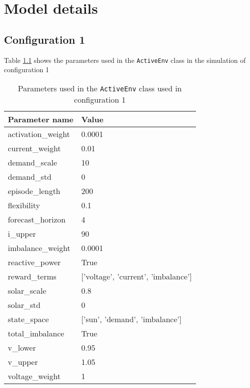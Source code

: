 \documentclass[class=book, crop=false, 11pt]{standalone}
\begin{document}
\chapter{Model details}
\section{Configuration 1}\label{section:apendix_config1}
Table \ref{apendix:config1:params} shows the parameters used in the \texttt{ActiveEnv} class in the simulation of configuration 1

\begin{table}[ht]
\center
\caption{Parameters used in the \texttt{ActiveEnv} class used in configuration 1}
\begin{tabular}{ll}
Parameter name     & Value                                     \\
\hline
activation\_weight & 0.0001                                    \\
current\_weight    & 0.01                                      \\
demand\_scale      & 10                                        \\
demand\_std        & 0                                         \\
episode\_length    & 200                                       \\
flexibility        & 0.1                                       \\
forecast\_horizon  & 4                                         \\
i\_upper           & 90                                        \\
imbalance\_weight  & 0.0001                                    \\
reactive\_power    & True                                     \\
reward\_terms      & {[}'voltage',  'current',  'imbalance'{]} \\
solar\_scale       & 0.8                                       \\
solar\_std         & 0                                         \\
state\_space       & {[}'sun', 'demand',  'imbalance'{]}       \\
total\_imbalance   & True                                      \\
v\_lower           & 0.95                                      \\
v\_upper           & 1.05                                      \\
voltage\_weight    & 1                                         \\
\hline
\end{tabular}
\label{apendix:config1:params}
\end{table}
\end{document}
